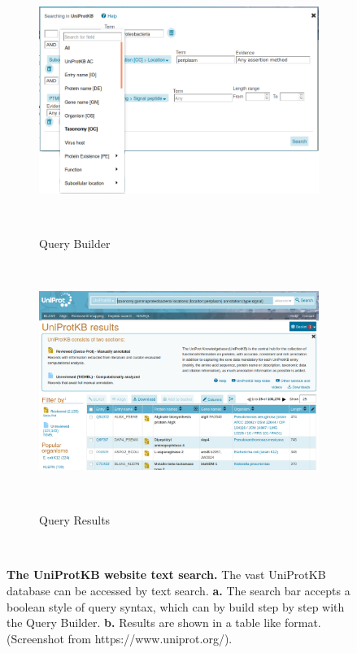 ~\begin{figure}[h!]
	~\begin{subfigure}[b]{\linewidth}
		\centering
		\includegraphics[width=\linewidth,height=0.3\textheight,keepaspectratio]
			{./literature_review/UniProtKB/text_search/img/query_builder.png}
		\caption{Query Builder}
		\label{fig:query_builder}
	~\end{subfigure}
	~\begin{subfigure}[b]{\linewidth}
		\centering
		\includegraphics[width=\linewidth, height=0.5\textheight,keepaspectratio]
			{./literature_review/UniProtKB/text_search/img/query_results.png}
		\caption{Query Results}
		\label{fig:query_results}
	~\end{subfigure}
	\caption{
		\textbf{The UniProtKB website text search.}
		The vast UniProtKB database can be accessed by text search.
		\textbf{a.} The search bar accepts a boolean style of query syntax, 
		which can by build step by step with the Query Builder.
		\textbf{b.} Results are shown in a table like format.
		(Screenshot from https://www.uniprot.org/).
		}
~\end{figure}
